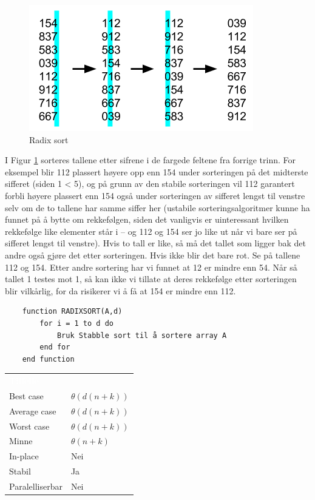 \begin{figure}[H]
\includegraphics[scale=0.7]{images/radixsort}
\centering %
\caption{Radix sort}
\label{fig:radixsort}
\end{figure}

\noindent I Figur \ref{fig:radixsort} sorteres tallene etter sifrene i de fargede feltene fra forrige trinn. For eksempel blir 112 plassert høyere opp enn 154 under sorteringen på det midterste sifferet (siden 1 < 5), og på grunn av den stabile sorteringen vil 112 garantert forbli høyere plassert enn 154 også under sorteringen av sifferet lengst til venstre selv om de to tallene har samme siffer her (ustabile sorteringsalgoritmer kunne ha funnet på å bytte om rekkefølgen, siden det vanligvis er uinteressant hvilken rekkefølge like elementer står i – og 112 og 154 ser jo like ut når vi bare ser på sifferet lengst til venstre). Hvis to tall er like, så må det tallet som ligger bak det andre også gjøre det etter sorteringen. Hvis ikke blir det bare rot. Se på tallene 112 og 154. Etter andre sortering har vi funnet at 12 er mindre enn 54. Når så tallet 1 testes mot 1, så kan ikke vi tillate at deres rekkefølge etter sorteringen blir vilkårlig, for da risikerer vi å få at 154 er mindre enn 112.

\begin{lstlisting}
    function RADIXSORT(A,d)
    	for i = 1 to d do
    		Bruk Stabble sort til å sortere array A
    	end for
    end function
\end{lstlisting}

\begin{table}[H]
    \label{tab:bubblesort}
    \centering
    \begin{tabular}{|L{15em} | L{15em}|}
        \hline
        \textbf{\textcolor{white}{Tilfelle}} & \textbf{\textcolor{white}{}}\\
        Best case & $\theta(d(n + k))$\\
        Average case & $\theta(d(n + k))$\\
        Worst case & $\theta(d(n + k))$\\
        Minne & $\theta(n + k)$\\
        In-place & Nei\\
        Stabil & Ja\\
        Paralelliserbar & Nei\\
         \hline
    \end{tabular}
\end{table}

